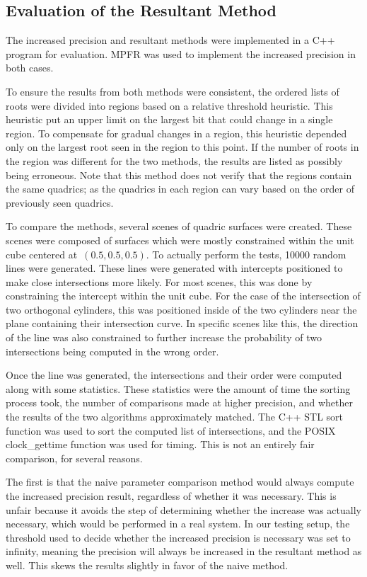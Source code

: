 \documentclass{cccg16}
\begin{document}
\subsection{Evaluation of the Resultant Method}
The increased precision and resultant methods were implemented in a
C++ program for evaluation.  MPFR was used to implement the increased
precision in both cases.

To ensure the results from both methods were consistent, the ordered
lists of roots were divided into regions based on a relative threshold
heuristic.  This heuristic put an upper limit on the largest bit that
could change in a single region.  To compensate for gradual changes in
a region, this heuristic depended only on the largest root seen in the
region to this point.  If the number of roots in the region was
different for the two methods, the results are listed as possibly
being erroneous.  Note that this method does not verify that the
regions contain the same quadrics; as the quadrics in each region can
vary based on the order of previously seen quadrics.

To compare the methods, several scenes of quadric surfaces were
created.  These scenes were composed of surfaces which were mostly
constrained within the unit cube centered at~$(0.5, 0.5, 0.5)$.  To
actually perform the tests, 10000 random lines were generated.  These
lines were generated with intercepts positioned to make close
intersections more likely.  For most scenes, this was done by
constraining the intercept within the unit cube.  For the case of the
intersection of two orthogonal cylinders, this was positioned inside
of the two cylinders near the plane containing their intersection
curve.  In specific scenes like this, the direction of the line was
also constrained to further increase the probability of two
intersections being computed in the wrong order.

Once the line was generated, the intersections and their order were
computed along with some statistics.  These statistics were the amount
of time the sorting process took, the number of comparisons made at
higher precision, and whether the results of the two algorithms
approximately matched.  The C++ STL sort function was used to sort the
computed list of intersections, and the POSIX clock\_gettime function
was used for timing.  This is not an entirely fair comparison, for
several reasons.

The first is that the naive parameter comparison method would always
compute the increased precision result, regardless of whether it was
necessary.  This is unfair because it avoids the step of determining
whether the increase was actually necessary, which would be performed
in a real system.  In our testing setup, the threshold used to decide
whether the increased precision is necessary was set to infinity,
meaning the precision will always be increased in the resultant method
as well.  This skews the results slightly in favor of the naive
method.
\end{document}
